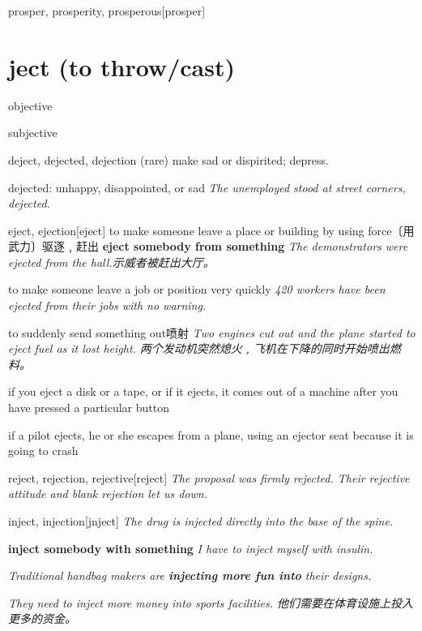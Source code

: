 \begin{DefWord}{prosper, prosperity, prosperous}[prosper]
\end{DefWord}

\section{ject (to throw/cast)}

\begin{DefWord}{objective}
\end{DefWord}

\begin{DefWord}{subjective}
\end{DefWord}

\begin{DefWord}{deject, dejected, dejection}
    (rare) make sad or dispirited; depress.

    dejected: unhappy, disappointed, or sad
    \textit{The unemployed stood at street corners, dejected.}
\end{DefWord}

\begin{DefWord}{eject, ejection}[eject]
    to make someone leave a place or building by using force〔用武力〕驱逐﹐赶出
    \textbf{eject somebody from something}
    \textit{The demonstrators were ejected from the hall.示威者被赶出大厅。}

    to make someone leave a job or position very quickly
    \textit{420 workers have been ejected from their jobs with no warning.}

    to suddenly send something out喷射
    \textit{Two engines cut out and the plane started to eject fuel as it lost height. 两个发动机突然熄火﹐飞机在下降的同时开始喷出燃料。}

    if you eject a disk or a tape, or if it ejects, it comes out of a machine after you have pressed a particular button

    if a pilot ejects, he or she escapes from a plane, using an ejector seat because it is going to crash
\end{DefWord}

\begin{DefWord}{reject, rejection, rejective}[reject]
    \textit{The proposal was firmly rejected. Their rejective attitude and blank rejection let us down.}
\end{DefWord}

\begin{DefWord}{inject, injection}[jnject]
    \textit{The drug is injected directly into the base of the spine.}

    \textbf{inject somebody with something}
    \textit{I have to inject myself with insulin.}
    
    \textit{Traditional handbag makers are \textbf{injecting more fun into} their designs.}

    \textit{They need to inject more money into sports facilities. 他们需要在体育设施上投入更多的资金。}
\end{DefWord}


